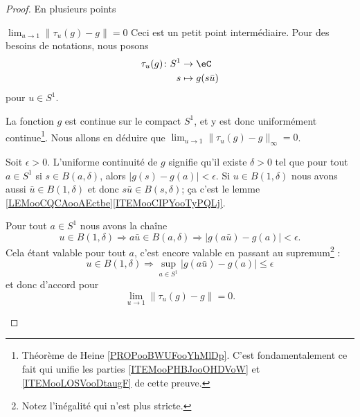 \begin{proof}
    
    En plusieurs points
    \begin{subproof}

        \item[\( \lim_{u\to 1} \| \tau_u(g)-g \|=0\)]
            Ceci est un petit point intermédiaire. Pour des besoins de notations, nous posons
            \begin{equation}
                \begin{aligned}
                    \tau_u(g)\colon S^1&\to \eC \\
                    s&\mapsto g(s\bar u)
                \end{aligned}
            \end{equation}
            pour \( u\in S^1\). 

            La fonction \( g\) est continue sur le compact \( S^1\), et y est donc uniformément continue\footnote{Théorème de Heine \ref{PROPooBWUFooYhMlDp}. C'est fondamentalement ce fait qui unifie les parties \ref{ITEMooPHBJooOHDVoW} et \ref{ITEMooLOSVooDtaugF} de cette preuve.}. Nous allons en déduire que \( \lim_{u\to 1} \| \tau_u(g)-g \|_{\infty}=0\).

            Soit \( \epsilon>0\). L'uniforme continuité de \( g\) signifie qu'il existe \( \delta>0\) tel que pour tout \( a\in S^1\) si \( s\in B(a,\delta)\), alors \( \big| g(s)-g(a) \big|<\epsilon\). Si \( u\in B(1,\delta)\) nous avons aussi \( \bar u\in B(1,\delta)\) et donc \( s\bar u\in B(s,\delta)\); ça c'est le lemme \ref{LEMooCQCAooAEctbe}\ref{ITEMooCIPYooTyPQLj}.

            Pour tout \( a\in S^1\) nous avons la chaîne
            \begin{equation}
                u\in B(1,\delta)\Rightarrow a\bar u\in B(a,\delta)\Rightarrow \big| g(a\bar u)-g(a) \big|<\epsilon.
            \end{equation}
            Cela étant valable pour tout \( a\), c'est encore valable en passant au supremum\footnote{Notez l'inégalité qui n'est plus stricte.} :
            \begin{equation}
                u\in B(1,\delta)\Rightarrow\sup_{a\in S^1}\big| g(a\bar u)-g(a) \big|\leq\epsilon
            \end{equation}
            et donc d'accord pour
            \begin{equation}
                \lim_{u\to 1} \| \tau_u(g)-g \|=0.
            \end{equation}


\end{subproof}
\end{proof}

